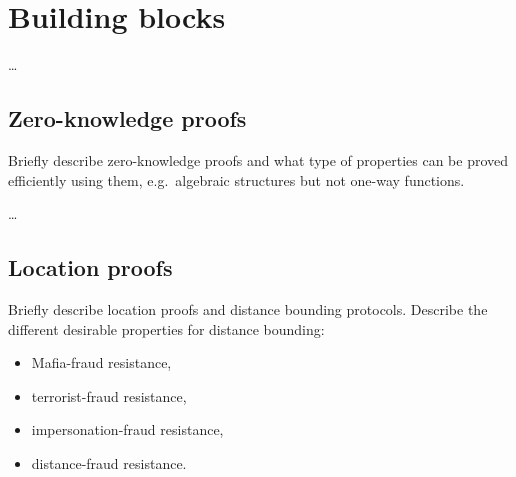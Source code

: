 \section{Building blocks}%
\label{Primitives}\label{BuildingBlocks}

\dots

\subsection{Zero-knowledge proofs}

Briefly describe zero-knowledge proofs and what type of properties can be proved 
efficiently using them, e.g.\ algebraic structures but not one-way functions.

\dots

\subsection{Location proofs}

Briefly describe location proofs and distance bounding protocols.
Describe the different desirable properties for distance bounding:
\begin{itemize}
  \item Mafia-fraud resistance,
  \item terrorist-fraud resistance,
  \item impersonation-fraud resistance,
  \item distance-fraud resistance.
\end{itemize}

